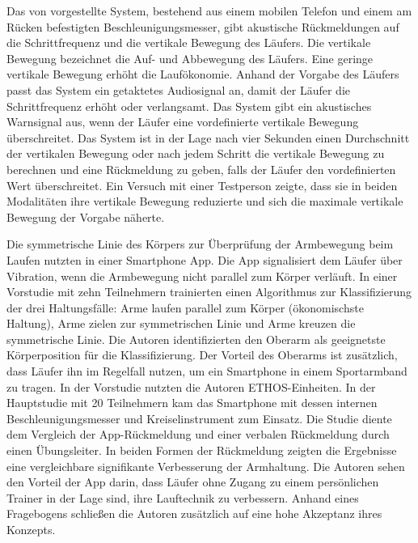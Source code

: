 Das von \citet{Eriksson2010} vorgestellte System, bestehend aus einem mobilen Telefon und einem am Rücken befestigten Beschleunigungsmesser, gibt akustische Rückmeldungen auf die Schrittfrequenz und die vertikale Bewegung des Läufers. Die vertikale Bewegung bezeichnet die Auf- und Abbewegung des Läufers. Eine geringe vertikale Bewegung erhöht die Laufökonomie. Anhand der Vorgabe des Läufers passt das System ein getaktetes Audiosignal an, damit der Läufer die Schrittfrequenz erhöht oder verlangsamt. Das System gibt ein akustisches Warnsignal aus, wenn der Läufer eine vordefinierte vertikale Bewegung überschreitet. Das System ist in der Lage nach vier Sekunden einen Durchschnitt der vertikalen Bewegung oder nach jedem Schritt die vertikale Bewegung zu berechnen und eine Rückmeldung zu geben, falls der Läufer den vordefinierten Wert überschreitet. Ein Versuch mit einer Testperson zeigte, dass sie in beiden Modalitäten ihre vertikale Bewegung reduzierte und sich die maximale vertikale Bewegung der Vorgabe näherte.

Die symmetrische Linie des Körpers zur Überprüfung der Armbewegung beim Laufen nutzten \citet{Strohrmann2013, Strohrmann2014} in einer Smartphone App. Die App signalisiert dem Läufer über Vibration, wenn die Armbewegung nicht parallel zum Körper verläuft. In einer Vorstudie mit zehn Teilnehmern trainierten \citet{Strohrmann2013} einen Algorithmus zur Klassifizierung der drei Haltungsfälle: Arme laufen parallel zum Körper (ökonomischste Haltung), Arme zielen zur symmetrischen Linie und Arme kreuzen die symmetrische Linie. Die Autoren identifizierten den Oberarm als geeignetste Körperposition für die Klassifizierung. Der Vorteil des Oberarms ist zusätzlich, dass Läufer ihn im Regelfall nutzen, um ein Smartphone in einem Sportarmband zu tragen. In der Vorstudie nutzten die Autoren ETHOS-Einheiten. In der Hauptstudie mit 20 Teilnehmern kam das Smartphone mit dessen internen Beschleunigungsmesser und Kreiselinstrument zum Einsatz. Die Studie diente dem Vergleich der App-Rückmeldung und einer verbalen Rückmeldung durch einen Übungsleiter. In beiden Formen der Rückmeldung zeigten die Ergebnisse eine vergleichbare signifikante Verbesserung der Armhaltung. Die Autoren sehen den Vorteil der App darin, dass Läufer ohne Zugang zu einem persönlichen Trainer in der Lage sind, ihre Lauftechnik zu verbessern. Anhand eines Fragebogens schließen die Autoren zusätzlich auf eine hohe Akzeptanz ihres Konzepts.

